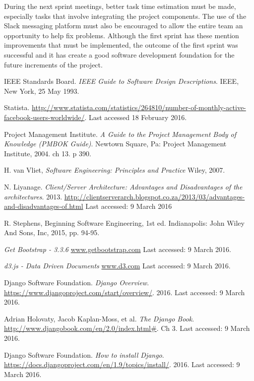\documentclass[12pt,onecolumn]{article}
\begin{document}
	During the next sprint meetings, better task time estimation must be made, especially tasks that involve integrating the project components. The use of the Slack messaging platform must also be encouraged to allow the entire team an opportunity to help fix problems. Although the first sprint has these mention improvements that must be implemented, the outcome of the first sprint was successful and it has create a good software development foundation for the future increments of the project.
	
	\begin{thebibliography}{1}
		 IEEE Standards Board. \emph{IEEE Guide to Software Design Descriptions}. IEEE, New York, 25 May 1993.
		
		 Statista. \url {http://www.statista.com/statistics/264810/number-of-monthly-active-facebook-users-worldwide/}. Last accessed 18 February 2016. 
		
		 Project Management Institute. \emph{A Guide to the Project Management Body of Knowledge (PMBOK Guide)}. Newtown Square, Pa: Project Management Institute, 2004. ch 13. p 390.
		
		 H. van Vliet, \emph{Software Engineering: Principles and Practice} Wiley, 2007.
		
		 N. Liyanage. \emph{Client/Server Architecture: Advantages and Disadvantages of the architectures}. 2013. \url{http://clientserverarch.blogspot.co.za/2013/03/advantages-and-disadvantages-of.html} Last accessed: 9 March 2016
		
		 R. Stephens, Beginning Software Engineering, 1st ed. Indianapolis: John Wiley And Sons, Inc, 2015, pp. 94-95.
		
		  \emph{Get Bootstrap - 3.3.6} \url{www.getbootstrap.com} Last accessed: 9 March 2016.
		
		  \emph{d3.js - Data Driven Documents} \url{www.d3.com} Last accessed: 9 March 2016.
		
		 Django Software Foundation. \emph{Django Overview}. \url{https://www.djangoproject.com/start/overview/}. 2016. Last accessed: 9 March 2016. 
		
		 Adrian Holovaty, Jacob Kaplan-Moss, et al. \emph{The Django Book}. \url{http://www.djangobook.com/en/2.0/index.html#}. Ch 3. Last accessed: 9 March 2016.
		
		 Django Software Foundation. \emph{How to install Django}. \url{https://docs.djangoproject.com/en/1.9/topics/install/}. 2016. Last accessed: 9 March 2016.	
		

\end{thebibliography}
\end{document}
